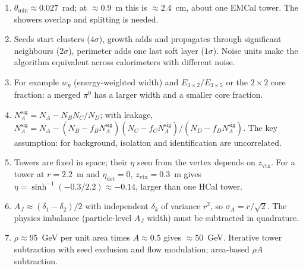 \documentclass[11pt,letterpaper]{article}
\begin{document}
\begin{enumerate}[label=A\arabic*.]
\item $\theta_{\min}\approx0.027$~rad; at $\approx0.9$~m this is $\approx2.4$~cm, about one EMCal tower. The showers overlap and splitting is needed.
\item Seeds start clusters ($4\sigma$), growth adds and propagates through significant neighbours ($2\sigma$), perimeter adds one last soft layer ($1\sigma$). Noise units make the algorithm equivalent across calorimeters with different noise.
\item For example $w_\eta$ (energy-weighted width) and $E_{3\times2}/E_{3\times5}$ or the $2\times2$ core fraction: a merged $\pi^0$ has a larger width and a smaller core fraction.
\item $N_A^{\mathrm{sig}}=N_A-N_BN_C/N_D$; with leakage, $N_A^{\mathrm{sig}}=N_A-(N_B-f_BN_A^{\mathrm{sig}})(N_C-f_CN_A^{\mathrm{sig}})/(N_D-f_DN_A^{\mathrm{sig}})$. The key assumption: for background, isolation and identification are uncorrelated.
\item Towers are fixed in space; their $\eta$ seen from the vertex depends on $z_{\mathrm{vtx}}$. For a tower at $r=2.2$~m and $\eta_{\mathrm{det}}=0$, $z_{\mathrm{vtx}}=0.3$~m gives $\eta=\sinh^{-1}(-0.3/2.2)\approx-0.14$, larger than one HCal tower.
\item $A_J\approx(\delta_1-\delta_2)/2$ with independent $\delta_k$ of variance $r^2$, so $\sigma_A=r/\sqrt2$. The physics imbalance (particle-level $A_J$ width) must be subtracted in quadrature.
\item $\rho\approx95$~GeV per unit area times $A\approx0.5$ gives $\approx50$~GeV. Iterative tower subtraction with seed exclusion and flow modulation; area-based $\rho A$ subtraction.
\end{enumerate}
\end{document}
